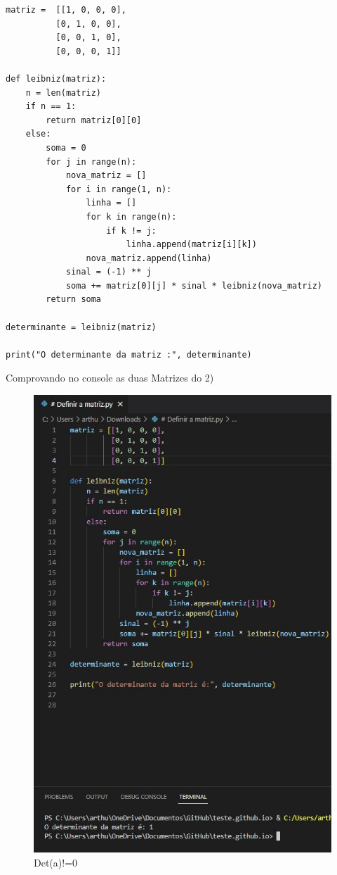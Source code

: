 \documentclass{article}
\begin{document}
\begin{lstlisting}
matriz =  [[1, 0, 0, 0],
          [0, 1, 0, 0],
          [0, 0, 1, 0],
          [0, 0, 0, 1]]

def leibniz(matriz):
    n = len(matriz)
    if n == 1:
        return matriz[0][0]
    else:
        soma = 0
        for j in range(n):
            nova_matriz = []
            for i in range(1, n):
                linha = []
                for k in range(n):
                    if k != j:
                        linha.append(matriz[i][k])
                nova_matriz.append(linha)
            sinal = (-1) ** j
            soma += matriz[0][j] * sinal * leibniz(nova_matriz)
        return soma

determinante = leibniz(matriz)

print("O determinante da matriz :", determinante)

\end{lstlisting}
Comprovando no console as duas Matrizes do 2)


\begin{figure}
    \centering
    \includegraphics{Matriz1.JPG}
    \caption{Det(a)!=0}
    \label{fig:my_label}
\end{figure}
\end{document}
